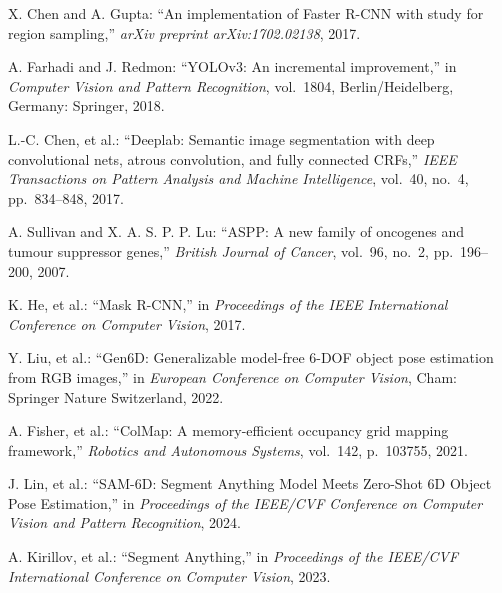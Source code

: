 \begin{thebibliography}{99}
	X. Chen and A. Gupta: 
			``An implementation of Faster R-CNN with study for region sampling,'' 
			{\it arXiv preprint arXiv:1702.02138}, 2017.

		A. Farhadi and J. Redmon: 
				``YOLOv3: An incremental improvement,'' 
				in {\it Computer Vision and Pattern Recognition}, vol.~1804, 
				Berlin/Heidelberg, Germany: Springer, 2018.
			
		L.-C. Chen, et al.: 
				``Deeplab: Semantic image segmentation with deep convolutional nets, atrous convolution, and fully connected CRFs,'' 
				{\it IEEE Transactions on Pattern Analysis and Machine Intelligence}, 
				vol.~40, no.~4, pp.~834--848, 2017.

		A. Sullivan and X. A. S. P. P. Lu: 
				``ASPP: A new family of oncogenes and tumour suppressor genes,'' 
				{\it British Journal of Cancer}, 
				vol.~96, no.~2, pp.~196--200, 2007.

		K. He, et al.: 
    		``Mask R-CNN,'' 
    		in {\it Proceedings of the IEEE International Conference on Computer Vision}, 2017.

		Y. Liu, et al.: 
    ``Gen6D: Generalizable model-free 6-DOF object pose estimation from RGB images,'' 
    in {\it European Conference on Computer Vision}, Cham: Springer Nature Switzerland, 2022.

		A. Fisher, et al.: 
				``ColMap: A memory-efficient occupancy grid mapping framework,'' 
				{\it Robotics and Autonomous Systems}, 
				vol.~142, p.~103755, 2021.
		
		J. Lin, et al.: 
				``SAM-6D: Segment Anything Model Meets Zero-Shot 6D Object Pose Estimation,'' 
				in {\it Proceedings of the IEEE/CVF Conference on Computer Vision and Pattern Recognition}, 2024.
				
		A. Kirillov, et al.: 
				``Segment Anything,'' 
				in {\it Proceedings of the IEEE/CVF International Conference on Computer Vision}, 2023.
				



\end{thebibliography}
